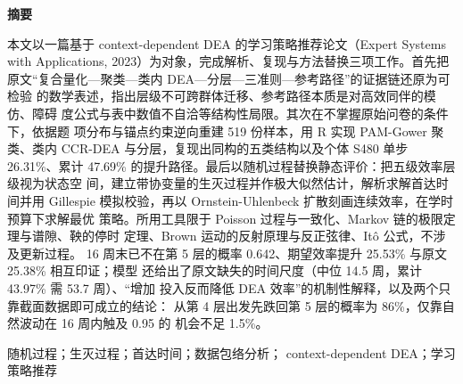 \begin{center}
{\heiti\bfseries\fontsize{14pt}{22pt}\selectfont 摘\quad 要}
\end{center}

\vspace{0.2cm}

本文以一篇基于 context-dependent DEA 的学习策略推荐论文（Expert Systems
with Applications, 2023）为对象，完成解析、复现与方法替换三项工作。首先把
原文“复合量化—聚类—类内 DEA—分层—三准则—参考路径”的证据链还原为可检验
的数学表述，指出层级不可跨群体迁移、参考路径本质是对高效同伴的模仿、障碍
度公式与表中数值不自洽等结构性局限。其次在不掌握原始问卷的条件下，依据题
项分布与锚点约束逆向重建 519 份样本，用 R 实现 PAM-Gower 聚类、类内
CCR-DEA 与分层，复现出同构的五类结构以及个体 S480 单步 26.31\%、累计
47.69\% 的提升路径。最后以随机过程替换静态评价：把五级效率层级视为状态空
间，建立带协变量的生灭过程并作极大似然估计，解析求解首达时间并用 Gillespie
模拟校验，再以 Ornstein-Uhlenbeck 扩散刻画连续效率，在学时预算下求解最优
策略。所用工具限于 Poisson 过程与一致化、Markov 链的极限定理与谱隙、鞅的停时
定理、Brown 运动的反射原理与反正弦律、Itô 公式，不涉及更新过程。
16 周末已不在第 5 层的概率 0.642、期望效率提升 25.53\% 与原文 25.38\% 相互印证；模型
还给出了原文缺失的时间尺度（中位 14.5 周，累计 43.97\% 需 53.7 周）、“增加
投入反而降低 DEA 效率”的机制性解释，以及两个只靠截面数据即可成立的结论：
从第 4 层出发先跌回第 5 层的概率为 86\%，仅靠自然波动在 16 周内触及 0.95 的
机会不足 1.5\%。

\vspace{0.4cm}

随机过程；生灭过程；首达时间；数据包络分析；
context-dependent DEA；学习策略推荐
